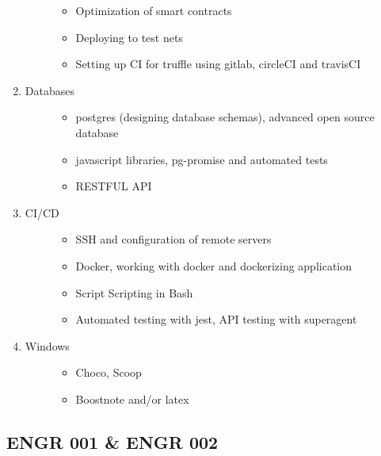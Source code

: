 \begin{enumerate}
\begin{description}
\begin{itemize}
  \item
    Optimization of smart contracts
  \item
    Deploying to test nets
  \item
    Setting up CI for truffle using gitlab, circleCI and travisCI
  \end{itemize}
  \end{description}
\item
  \begin{description}
  \item[Databases]
  \begin{itemize}
  \tightlist
  \item
    postgres (designing database schemas), advanced open source database
  \item
    javascript libraries, pg-promise and automated tests
  \item
    RESTFUL API
  \end{itemize}
  \end{description}
\item
  \begin{description}
  \item[CI/CD]
  \begin{itemize}
  \tightlist
  \item
    SSH and configuration of remote servers
  \item
    Docker, working with docker and dockerizing application
  \item
    Script Scripting in Bash
  \item
    Automated testing with jest, API testing with superagent
  \end{itemize}
  \end{description}
\item
  \begin{description}
  \item[Windows]
  \begin{itemize}
  \tightlist
  \item
    Choco, Scoop
  \item
    Boostnote and/or latex
  \end{itemize}
  \end{description}
\end{enumerate}


\subsection{ENGR 001 \& ENGR 002}\label{engr-001-engr-002}

